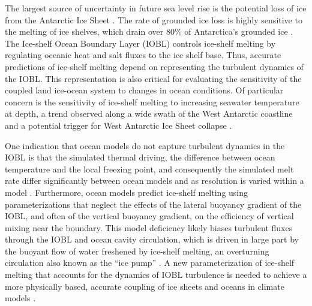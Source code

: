 \documentclass[tc, manuscript]{copernicus}
\begin{document}
The largest source of uncertainty in future sea level rise is the potential loss of ice from the Antarctic Ice Sheet \citep{ipcc_climate_2014}. The rate of grounded ice loss is highly sensitive to the melting of ice shelves, which drain over 80\% of Antarctica’s grounded ice \citep{reese_far_2018, rignot_ice-shelf_2013}. The Ice-shelf Ocean Boundary Layer (IOBL) controls ice-shelf melting by regulating oceanic heat and salt fluxes to the ice shelf base. Thus, accurate predictions of ice-shelf melting depend on representing the turbulent dynamics of the IOBL. This representation is also critical for evaluating the sensitivity of the coupled land ice-ocean system to changes in ocean conditions. Of particular concern is the sensitivity of ice-shelf melting to increasing seawater temperature at depth, a trend observed along a wide swath of the West Antarctic coastline and a potential trigger for West Antarctic Ice Sheet collapse \citep{purkey_unabated_2018, ruan_ice-shelf_2021, schmidtko_multidecadal_2014, wahlin_pathways_2021}. 

One indication that ocean models do not capture turbulent dynamics in the IOBL is that the simulated thermal driving, the difference between ocean temperature and the local freezing point, and consequently the simulated melt rate differ significantly between ocean models and as resolution is varied within a model \citep{gwyther_cold_2020}. Furthermore, ocean models predict ice-shelf melting using parameterizations that neglect the effects of the lateral buoyancy gradient of the IOBL, and often of the vertical buoyancy gradient, on the efficiency of vertical mixing near the boundary. This model deficiency likely biases turbulent fluxes through the IOBL and ocean cavity circulation, which is driven in large part by the buoyant flow of water freshened by ice-shelf melting, an overturning circulation also known as the ``ice pump'' \citep{webber_impact_2018}. A new parameterization of ice-shelf melting that accounts for the dynamics of IOBL turbulence is needed to achieve a more physically based, accurate coupling of ice sheets and oceans in climate models \citep{dinniman_modeling_2016, edwards_projected_2021, gwyther_cold_2020, naughten_future_2018}.
\end{document}
